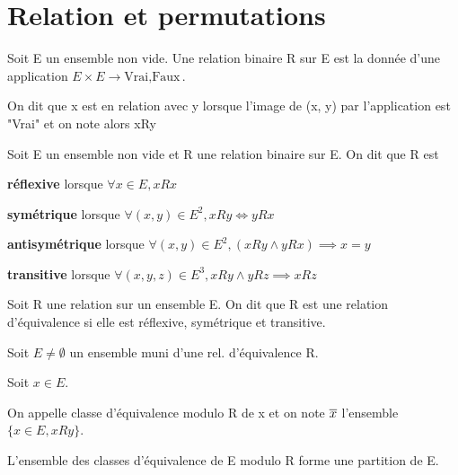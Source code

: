\documentclass[a4paper, 12pt]{article}
\begin{document}
\section{Relation et permutations}

\begin{definition}
    Soit E un ensemble non vide. Une relation binaire R sur E est la donnée d'une application
    $E \times E \to {\text{Vrai}, \text{Faux}}$.

    On dit que x est en relation avec y lorsque l'image de (x, y) par l'application
    est "Vrai" et on note alors xRy
\end{definition}

\begin{remark}
\end{remark}

\begin{definition}
    Soit E un ensemble non vide et R une relation binaire sur E. On dit que R est

    \item \textbf{réflexive} lorsque $\forall x \in E, xRx$
    \item \textbf{symétrique} lorsque $\forall(x, y) \in E^2, xRy \iff yRx$
    \item \textbf{antisymétrique} lorsque $\forall (x, y) \in E^2, (xRy \land yRx) \implies x = y$
    \item \textbf{transitive} lorsque $\forall (x, y, z) \in E^3, xRy \land yRz \implies xRz$
\end{definition}

\begin{definition}
    Soit R une relation sur un ensemble E. On dit que R est une relation d'équivalence si elle est
    réflexive, symétrique et transitive.
\end{definition}

\begin{definition}
    Soit $E \neq \emptyset$ un ensemble muni d'une rel. d'équivalence R.

    Soit $x \in E$.

    On appelle classe d'équivalence modulo R de x et on note $\overline{x}$ l'ensemble $\{x \in E, xRy\}$.
\end{definition}

\begin{theorem}
    L'ensemble des classes d'équivalence de E modulo R forme une partition de E.
\end{theorem}

\begin{demonstration}
\end{demonstration}
\end{document}
